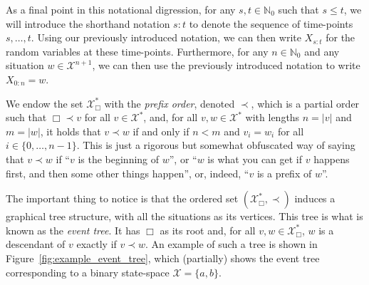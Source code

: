 \documentclass[graybox]{svmult}
\newcommand{\nats}{\mathbb{N}}
\newcommand{\natswith}{\nats_{0}}
\newcommand{\states}{\mathcal{X}}
\begin{document}
As a final point in this notational digression, for any $s,t\in\natswith$ such that $s\leq t$, we will introduce the shorthand notation $s:t$ to denote the sequence of time-points $s,\ldots,t$. Using our previously introduced notation, we can then write $X_{s:t}$ for the random variables at these time-points. Furthermore, for any $n\in\natswith$ and any situation $w\in\states^{n+1}$, we can then use the previously introduced notation to write $X_{0:n}=w$.

We endow the set $\states^*_\Box$ with the \emph{prefix order}, denoted $\prec$, which is a partial order such that $\Box\prec v$ for all $v\in\states^*$, and, for all $v,w\in\states^*$ with lengths $n=\lvert v\rvert$ and $m=\lvert w\rvert$, it holds that $v\prec w$ if and only if $n<m$ and $v_i=w_i$ for all $i\in\{0,\ldots,n-1\}$. This is just a rigorous but somewhat obfuscated way of saying that $v\prec w$ if ``$v$ is the beginning of $w$'', or ``$w$ is what you can get if $v$ happens first, and then some other things happen'', or, indeed, ``$v$ is a prefix of $w$''.

The important thing to notice is that the ordered set $(\states^*_\Box,\prec)$ induces a graphical tree structure, with all the situations as its vertices. This tree is what is known as the \emph{event tree}. It has $\Box$ as its root and, for all $v,w\in\states^*_\Box$, $w$ is a descendant of $v$ exactly if $v\prec w$. An example of such a tree is shown in Figure~\ref{fig:example_event_tree}, which (partially) shows the event tree corresponding to a binary state-space $\states=\{a,b\}$.
\end{document}
